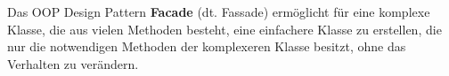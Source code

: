 Das OOP Design Pattern \textbf{Facade} (dt. Fassade) ermöglicht für eine komplexe Klasse, die aus vielen Methoden besteht, 
eine einfachere Klasse zu erstellen, 
die nur die notwendigen Methoden der komplexeren Klasse besitzt, ohne das Verhalten zu verändern.